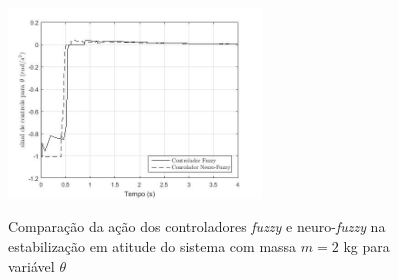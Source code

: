 \begin{figure}[!htb]
    \centering
    \caption{Comparação da ação dos controladores \textit{fuzzy} e neuro-\textit{fuzzy} na estabilização em atitude do sistema com massa $m=2$ kg para variável $\theta$}
    \includegraphics[width=0.6\textwidth]{./04-figuras/figuras_pos_banca/3-atitude2kg/fig_contoller_theta_2kg}
    \label{fig:fig_contoller_theta_2kg}
\end{figure}